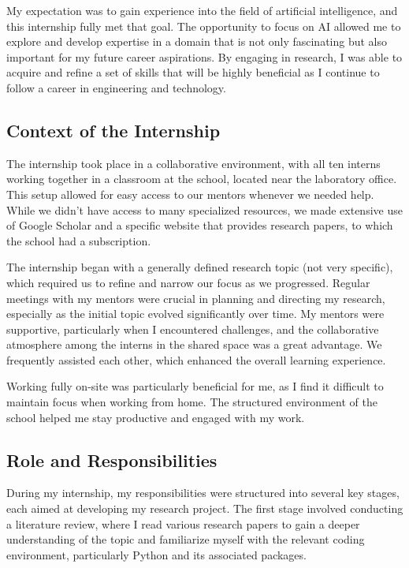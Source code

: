 My expectation was to gain experience into the field of artificial intelligence, and this internship fully met that
goal.
The opportunity to focus on AI allowed me to explore and develop expertise in a domain that is not only fascinating but
also important for my future career aspirations.
By engaging in research, I was able to acquire and refine a set of skills that will be highly beneficial as I continue
to follow a career in engineering and technology.

\subsection{Context of the Internship}\label{subsec:context-of-the-internship}
The internship took place in a collaborative environment, with all ten interns working together in a classroom at the
school, located near the laboratory office.
This setup allowed for easy access to our mentors whenever we needed help.
While we didn't have access to many specialized resources, we made extensive use of Google Scholar and a specific
website that provides research papers, to which the school had a subscription.

The internship began with a generally defined research topic (not very specific), which required us to refine and narrow
our focus as we progressed.
Regular meetings with my mentors were crucial in planning and directing my research, especially as the initial topic
evolved significantly over time.
My mentors were supportive, particularly when I encountered challenges, and the collaborative atmosphere among the
interns in the shared space was a great advantage.
We frequently assisted each other, which enhanced the overall learning experience.

Working fully on-site was particularly beneficial for me, as I find it difficult to maintain focus when working from
home.
The structured environment of the school helped me stay productive and engaged with my work.

\subsection{Role and Responsibilities}\label{subsec:role-and-responsibilities}
During my internship, my responsibilities were structured into several key stages, each aimed at developing my research
project.
The first stage involved conducting a literature review, where I read various research papers to gain a deeper
understanding of the topic and familiarize myself with the relevant coding environment, particularly Python and its
associated packages.

